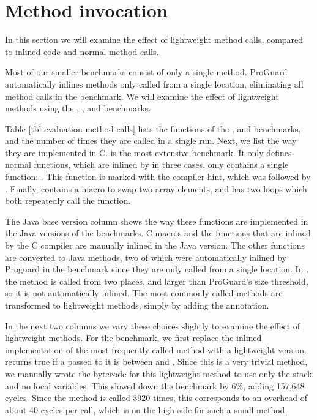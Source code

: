 \section{Method invocation}
\label{sec-evaluation-method-invocation}


In this section we will examine the effect of lightweight method calls, compared to inlined code and normal method calls.

Most of our smaller benchmarks consist of only a single method. ProGuard automatically inlines methods only called from a single location, eliminating all method calls in the  benchmark. We will examine the effect of lightweight methods using the , , and  benchmarks.

Table \ref{tbl-evaluation-method-calls} lists the functions of the ,  and  benchmarks, and the number of times they are called in a single run. Next, we list the way they are implemented in C.  is the most extensive benchmark. It only defines normal functions, which are inlined by  in three cases.  only contains a single function: . This function is marked with the  compiler hint, which was followed by . Finally,  contains a macro to swap two array elements, and has two loops which both repeatedly call the  function. 

The Java base version column shows the way these functions are implemented in the Java versions of the benchmarks. C macros and the functions that are inlined by the C compiler are manually inlined in the Java version. The other functions are converted to Java methods, two of which were automatically inlined by Proguard in the  benchmark since they are only called from a single location. In , the  method is called from two places, and larger than ProGuard's size threshold, so it is not automatically inlined. The most commonly called methods are transformed to lightweight methods, simply by adding the  annotation. %

In the next two columns we vary these choices slightly to examine the effect of lightweight methods. For the  benchmark, we first replace the inlined implementation of the most frequently called method with a lightweight version.  returns true if a  passed to it is between  and . Since this is a very trivial method, we manually wrote the bytecode for this lightweight method to use only the stack and no local variables. This slowed down the benchmark by 6\%, adding 157,648 cycles. Since the method is called 3920 times, this corresponds to an overhead of about 40 cycles per call, which is on the high side for such a small method.

